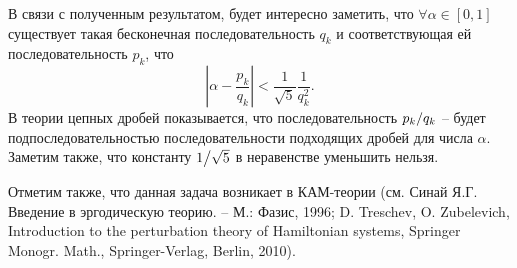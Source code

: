\begin{remark}

В связи с полученным результатом, будет интересно заметить, что $\forall \alpha \in [0, 1]$ существует такая бесконечная последовательность $q_{k} $ и соответствующая ей последовательность $p_{k} $, что
\[\left|\alpha -\frac{p_{k} }{q_{k} } \right|<\frac{1}{\sqrt{5} } \frac{1}{q_{k} ^{2} } .\] 
В теории цепных дробей показывается, что последовательность ${p_{k} \mathord{\left/ {\vphantom {p_{k}  q_{k} }} \right. \kern-\nulldelimiterspace} q_{k} } $ -- будет подпоследовательностью последовательности подходящих дробей для числа $\alpha $. Заметим также, что константу ${1\mathord{\left/ {\vphantom {1 \sqrt{5} }} \right. \kern-\nulldelimiterspace} \sqrt{5} } $ в неравенстве уменьшить нельзя.

Отметим также, что данная задача возникает в КАМ-теории (см. Синай Я.Г. Введение в эргодическую теорию. -- М.: Фазис, 1996; D. Treschev, O. Zubelevich, Introduction to the perturbation theory of Hamiltonian systems, Springer Monogr. Math., Springer-Verlag, Berlin, 2010).
\end{remark}


